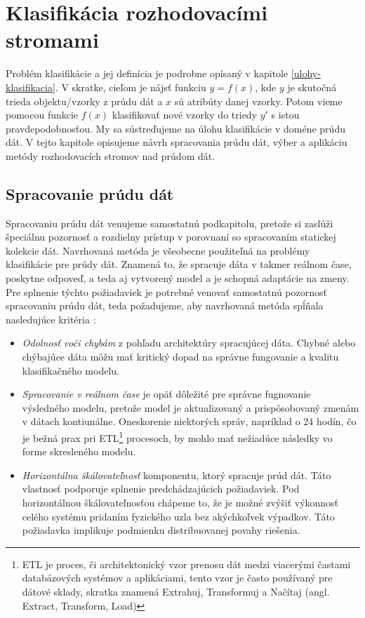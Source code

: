 \chapter{Klasifikácia rozhodovacími stromami}
\label{Klasifikácia rozhodovacími stromami}
Problém klasifikácie a jej definícia je podrobne opísaný v kapitole \ref{ulohy-klasifikacia}. V skratke, cieľom je nájsť funkciu $y = f(x)$, kde $y$ je skutočná trieda objektu/vzorky z prúdu dát a $x$ sú atribúty danej vzorky. Potom vieme pomocou funkcie $f(x)$ klasifikovať nové vzorky do triedy $y'$ s istou pravdepodobnosťou. My sa sústreďujeme na úlohu klasifikácie v doméne prúdu dát. V tejto kapitole opisujeme návrh spracovania prúdu dát, výber a aplikáciu metódy rozhodovacích stromov nad prúdom dát.

\section{Spracovanie prúdu dát}
\label{method-spracovanie-prudu-dat}

Spracovaniu prúdu dát venujeme samostatnú podkapitolu, pretože si zaslúži špeciálnu pozornosť a rozdielny prístup v porovnaní so spracovaním statickej kolekcie dát. Navrhovaná metóda je všeobecne použiteľná na problémy klasifikácie pre prúdy dát. Znamená to, že spracuje dáta v takmer reálnom čase, poskytne odpoveď, a teda aj vytvorený model a je schopná adaptácie na zmeny. Pre splnenie týchto požiadaviek je potrebné venovať samostatnú pozornosť spracovaniu prúdu dát, teda požadujeme, aby navrhovaná metóda spĺňala nasledujúce kritéria \citep{cimerman2015prudy}:
\begin{itemize}
	\item \textit{Odolnosť voči chybám} z pohľadu architektúry spracujúcej dáta. Chybné alebo chýbajúce dáta môžu mať kritický dopad na správne fungovanie a kvalitu klasifikačného modelu.
	\item \textit{Spracovanie v reálnom čase} je opäť dôležité pre správne fugnovanie výsledného modelu, pretože model je aktualizovaný a prispôsobovaný zmenám v dátach kontiunálne. Oneskorenie niektorých správ, napríklad o 24 hodín, čo je bežná prax pri ETL\footnote{ETL je proces, či architektonický vzor prenosu dát medzi viacerými častami databázových systémov  a aplikáciami, tento vzor je často používaný pre dátové sklady, skratka znamená Extrahuj, Transformuj a Načítaj (angl. Extract, Transform, Load)} procesoch, by mohlo mať nežiadúce následky vo forme skresleného modelu.
	\item \textit{Horizontálna škálovateľnosť} komponentu, ktorý spracuje prúd dát. Táto vlastnosť podporuje splnenie predchádzajúcich požiadaviek. Pod horizontálnou škálovateľnosťou chápeme to, že je možné zvýšiť výkonnosť celého systému pridaním fyzického uzla bez akýchkoľvek výpadkov. Táto požiadavka implikuje podmienku distribuovanej povahy riešenia.
\end{itemize}

